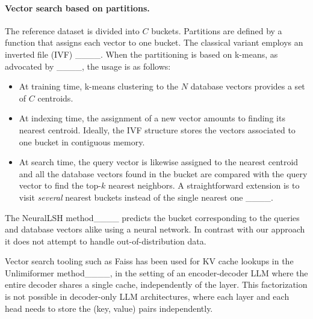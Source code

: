 \paragraph{Vector search based on partitions.}

\newcommand{\nlist}{C}
\newcommand{\nprobe}{\ell}

The reference dataset is divided into $\nlist$ buckets.
Partitions are defined by a function that assigns each vector to one bucket. 
The classical variant employs an inverted file (IVF) ____. 
When the partitioning is based on k-means, as advocated by ____, the usage is as follows: 
%
\ificml
\\[-2.1em]
\fi

\begin{itemize}
\item At training time, k-means clustering to the $N$ database vectors provides a set of $\nlist$ centroids.  \\[-1.7em]
\item At indexing time, the assignment of a new vector amounts to finding its nearest centroid.  
Ideally, the IVF structure stores the vectors associated to one bucket in contiguous memory.  \\[-1.7em]
%
\item At search time, the query vector is likewise assigned to the nearest centroid and all the database vectors found in the bucket are compared with the query vector to find the top-$k$ nearest neighbors. 
A straightforward extension is to visit \emph{several} 
%
nearest buckets instead of the single nearest one ____. 
\ificml
 \\[-1.9em]
 \fi
\end{itemize}

The NeuralLSH method____ predicts the bucket corresponding to the queries and database vectors alike using a neural network. 
%
In contrast with our approach it does not attempt to handle out-of-distribution data. 

Vector search tooling such as Faiss has been used for KV cache lookups in the Unlimiformer method____, in the setting of an encoder-decoder LLM where the entire decoder shares a single cache, independently of the layer. 
This factorization is not possible in decoder-only LLM architectures, where each layer and each head needs to store the (key, value) pairs independently.
%



%

%


%


